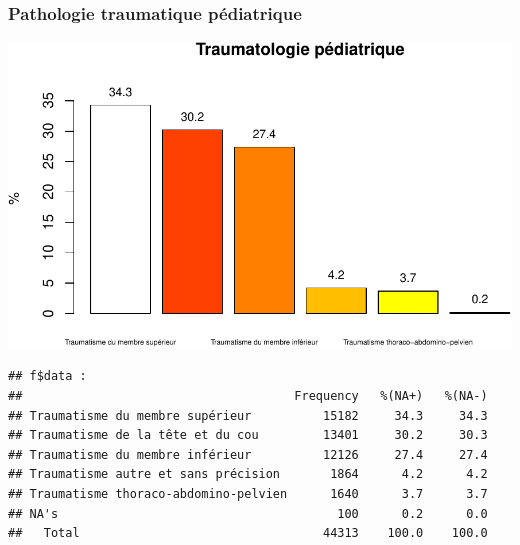 \documentclass[]{article}
\newenvironment{Shaded}{\begin{snugshade}}{\end{snugshade}}
\newcommand{\KeywordTok}[1]{\textcolor[rgb]{0.13,0.29,0.53}{\textbf{{#1}}}}
\newcommand{\DataTypeTok}[1]{\textcolor[rgb]{0.13,0.29,0.53}{{#1}}}
\newcommand{\FloatTok}[1]{\textcolor[rgb]{0.00,0.00,0.81}{{#1}}}
\newcommand{\StringTok}[1]{\textcolor[rgb]{0.31,0.60,0.02}{{#1}}}
\newcommand{\NormalTok}[1]{{#1}}
\begin{document}
\subsubsection{Pathologie traumatique
pédiatrique}\label{pathologie-traumatique-pediatrique}

\begin{Shaded}
\end{Shaded}

\includegraphics{analyse_merge_files/figure-latex/chap_ped_trau-1.pdf}\\

\begin{verbatim}
## f$data : 
##                                      Frequency   %(NA+)   %(NA-)
## Traumatisme du membre supérieur          15182     34.3     34.3
## Traumatisme de la tête et du cou         13401     30.2     30.3
## Traumatisme du membre inférieur          12126     27.4     27.4
## Traumatisme autre et sans précision       1864      4.2      4.2
## Traumatisme thoraco-abdomino-pelvien      1640      3.7      3.7
## NA's                                       100      0.2      0.0
##   Total                                  44313    100.0    100.0
\end{verbatim}
\end{document}
